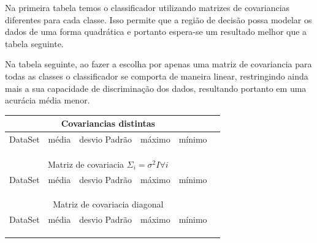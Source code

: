 \documentclass[ 
	article,			%
	11pt,				%
	oneside,			%
	a4paper,			%
	english,			%
	brazil,				%
	]{abntex2}
\begin{document}
Na primeira tabela temos o classificador utilizando matrizes de covariancias
diferentes para cada classe. Isso permite que a região de decisão possa modelar
os dados de uma forma quadrática e portanto espera-se um resultado melhor que a
tabela seguinte.

Na tabela seguinte, ao fazer a escolha por apenas uma matriz de covariancia para
todas as classes o classificador se comporta de maneira linear, restringindo
ainda mais a sua capacidade de discriminação dos dados, resultando portanto em
uma acurácia média menor.

\begin{table}
	\centering
    \begin{tabular}{|c|c|c|c|c|c}%
		  \multicolumn{5}{c}{Covariancias distintas}\\ \hline
          \hline DataSet & média & desvio Padrão & máximo & mínimo \\ \hline
           \\ \hline
           \\ \hline
           \\ \hline
		  
		  \multicolumn{5}{c}{Matriz de covariacia $\Sigma_i=\sigma^2I \forall
		  i$}\\
		  \hline \hline DataSet & média & desvio Padrão & máximo & mínimo \\ \hline
           \\ \hline
           \\ \hline
           \\ \hline 
		  
		  \multicolumn{5}{c}{Matriz de covariacia diagonal}\\ \hline
          \hline DataSet & média & desvio Padrão & máximo & mínimo \\ \hline
           \\ \hline
           \\ \hline
           \\ \hline     
		  

\end{tabular}
\end{table}
\end{document}
